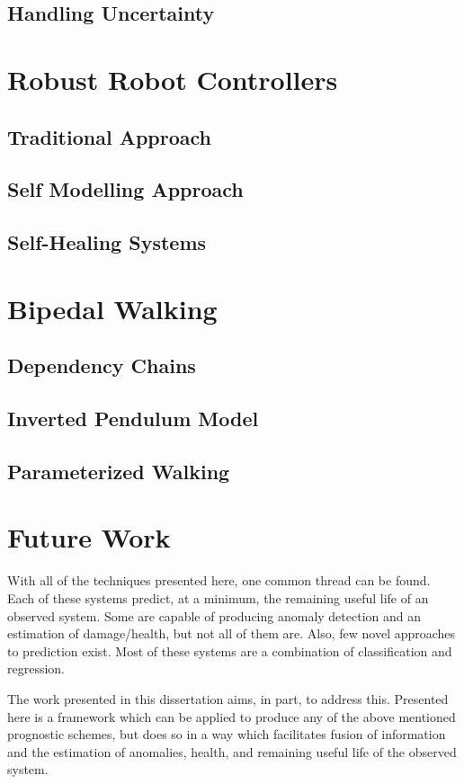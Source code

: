 \documentclass[12pt]{article}
\begin{document}
\subsection{Handling Uncertainty}

\section{Robust Robot Controllers}
\subsection{Traditional Approach}
\subsection{Self Modelling Approach}
\subsection{Self-Healing Systems}

\section{Bipedal Walking}
\subsection{Dependency Chains}
\subsection{Inverted Pendulum Model}
\subsection{Parameterized Walking}

\section{Future Work}
With all of the techniques presented here, one common thread can be found.
Each of these systems predict, at a minimum, the remaining useful life of an
observed system.  Some are capable of producing anomaly detection and an
estimation of damage/health, but not all of them are.  Also, few novel
approaches to prediction exist.  Most of these systems are a combination of
classification and regression.

The work presented in this dissertation aims, in part, to address this.
Presented here is a framework which can be applied to produce any of the above
mentioned prognostic schemes, but does so in a way which facilitates fusion of
information and the estimation of anomalies, health, and remaining useful life
of the observed system.  
\end{document}
